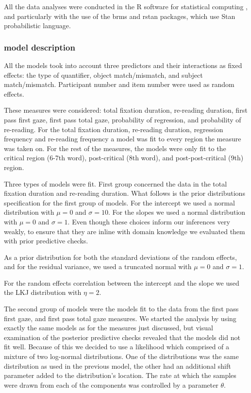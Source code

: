All the data analyses were conducted in the R software for statistical
computing \citep{Rcore}, and particularly with the use of the brms
\citep{bürkner2017brms} and rstan \citep{team2020rstan} packages,
which use Stan \citep{stan2021} probabilistic language.

\hypertarget{model-description}{%
\subsubsection{model description}\label{model-description}}

All the models took into account three predictors and their interactions
as fixed effects: the type of quantifier, object match/mismatch, and
subject match/mismatch. Participant number and item number were used as
random effects.

These measures were considered: total fixation duration, re-reading
duration, first pass first gaze, first pass
total gaze, probability of regression, and probability of re-reading.
For the total fixation duration, re-reading duration, regression
frequency and re-reading frequency a model was fit to every region the
measure was taken on. For the rest of the measures, the models were only
fit to the critical region (6-7th word), post-critical (8th word), and
post-post-critical (9th) region.

Three types of models were fit. First group concerned the data in the
total fixation duration and re-reading duration. What follows is the
prior distributions specification for the first group of models. For the
intercept we used a normal distribution with \(\mu = 0\) and
\(\sigma = 10\). For the slopes we used a normal distribution with
\(\mu = 0\) and \(\sigma = 1\). Even though these choices inform our
inferences very weakly, to ensure that they are inline with domain
knowledge we evaluated them with prior predictive checks.

As a prior distribution for both the standard deviations of the random
effects, and for the residual variance, we used a truncated normal with
\(\mu = 0\) and \(\sigma = 1\).

For the random effects correlation between the intercept and the slope
we used the LKJ distribution \citep{lewandowski2009gener,stan2021}
with \(\eta = 2\).

The second group of models were the models fit to the data from the
first pass first gaze, and first pass total gaze measures. We started
the analysis by using exactly the same models as for the measures just
discussed, but visual examination of the posterior predictive checks
revealed that the models did not fit well. Because of this we decided to
use a likelihood which comprised of a mixture of two log-normal
distributions. One of the distributions was the same distribution as
used in the previous model, the other had an additional shift parameter
added to the distribution's location. The rate at which the samples were
drawn from each of the components was controlled by a parameter
\(\theta\).

